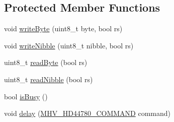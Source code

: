\subsection*{\-Protected \-Member \-Functions}
\begin{DoxyCompactItemize}
\item 
void \hyperlink{class_m_h_v___display___h_d44780___direct___connect_ac61f7b7429e954bbb418ec6f2a7942f8}{write\-Byte} (uint8\-\_\-t byte, bool rs)
\item 
void \hyperlink{class_m_h_v___display___h_d44780___direct___connect_afe47f18f28ff286d1d6a8e1018ae1ca1}{write\-Nibble} (uint8\-\_\-t nibble, bool rs)
\item 
uint8\-\_\-t \hyperlink{class_m_h_v___display___h_d44780___direct___connect_a395c757364dfea8eccb8d42d83d5060c}{read\-Byte} (bool rs)
\item 
uint8\-\_\-t \hyperlink{class_m_h_v___display___h_d44780___direct___connect_a8d4e15ba142eb565a021f17645fe6d0a}{read\-Nibble} (bool rs)
\item 
bool \hyperlink{class_m_h_v___display___h_d44780___direct___connect_af91e71543df100ec60594c9094cbd444}{is\-Busy} ()
\item 
void \hyperlink{class_m_h_v___display___h_d44780___direct___connect_a0446739e0eebe70e9c1e7b2d5aa74532}{delay} (\hyperlink{_m_h_v___display___h_d44780_8h_a76bff68a0c366080486a09e3beec77e1}{\-M\-H\-V\-\_\-\-H\-D44780\-\_\-\-C\-O\-M\-M\-A\-N\-D} command)
\end{DoxyCompactItemize}
